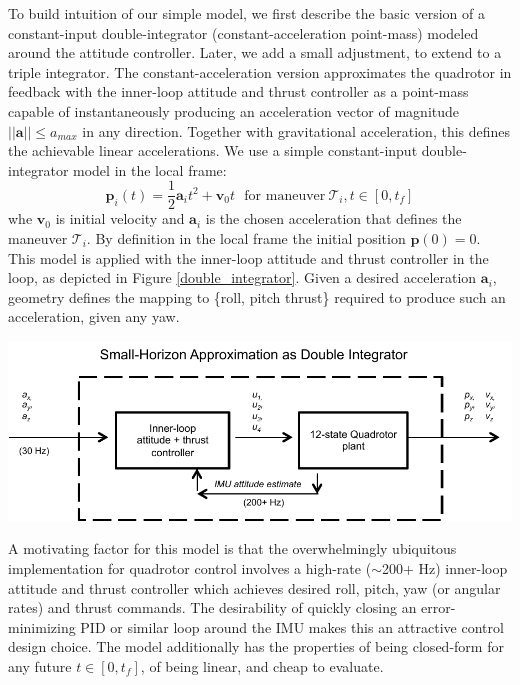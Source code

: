 \documentclass{llncs}
\begin{document}
To build intuition of our simple model, we first describe the basic version of a constant-input double-integrator (constant-acceleration point-mass) modeled around the attitude controller.  Later, we add a small adjustment, to extend to a triple integrator.   The constant-acceleration version approximates the quadrotor in feedback with the inner-loop attitude and thrust controller as a point-mass capable of instantaneously producing an acceleration vector of magnitude $||\textbf{a}|| \le {a}_{max}$ in any direction. Together with gravitational acceleration, this defines the achievable linear accelerations.  We use a simple constant-input double-integrator model in the local frame: 
%
\begin{equation}
\textbf{p}_i(t) = \frac{1}{2} \textbf{a}_i t^2 + \mathbf{v}_0 t \ \ \ \text{for maneuver} \  \mathcal{T}_i, t \in [0, t_f]
\end{equation}
%
whe $\mathbf{v}_0$ is initial velocity and $\textbf{a}_i$ is the chosen acceleration that defines the maneuver $\mathcal{T}_i$.  By definition in the local frame the initial position $\textbf{p}(0)=0$.  This model is applied with the inner-loop attitude and thrust controller in the loop, as depicted in Figure \ref{double_integrator}.  Given a desired acceleration $\textbf{a}_i$, geometry defines the mapping to \{roll, pitch thrust\} required to produce such an acceleration, given any yaw. 
%
\begin{center}
  \includegraphics[keepaspectratio=true,scale=0.6]{images/double_int.pdf}
  \label{double_integrator}%
\end{center}
%
A motivating factor for this model is that the overwhelmingly ubiquitous implementation for quadrotor control involves a high-rate ($\sim$200+ Hz) inner-loop attitude and thrust controller which achieves desired roll, pitch, yaw (or angular rates) and thrust commands.  The desirability of quickly closing an error-minimizing PID or similar loop around the IMU makes this an attractive control design choice. %
The model additionally has the properties of being closed-form for any future $t \in [0, t_f]$, of being linear, and cheap to evaluate.
\end{document}
